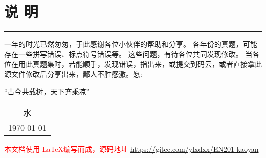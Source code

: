 




\chapter*{说 \quad 明}
\thispagestyle{empty}




\rule{2em}{0pt}一年的时光已然匆匆，于此感谢各位小伙伴的帮助和分享。
各年份的真题，可能存在一些拼写错误、标点符号错误等。
这些问题，有待各位共同发现修改。
当各位在用此真题集时，若能顺手，发现错误，指出来，或提交到码云，或者直接拿此源文件修改后分享出来，鄙人不胜感激。愿:
\begin{center}
	\kaishu 
	“古今共载树，天下齐乘凉”
\end{center}
\begin{center}
	\flushright
	\begin{tabular}{c}
		水   \\
		\today
	\end{tabular}	
\end{center}

\vfil
\noindent
\textcolor{red}{本文档使用 \LaTeX 编写而成，源码地址 \url{https://gitee.com/ylxdxx/EN201-kaoyan}  }
\vfil

\pagestyle{fancy}

